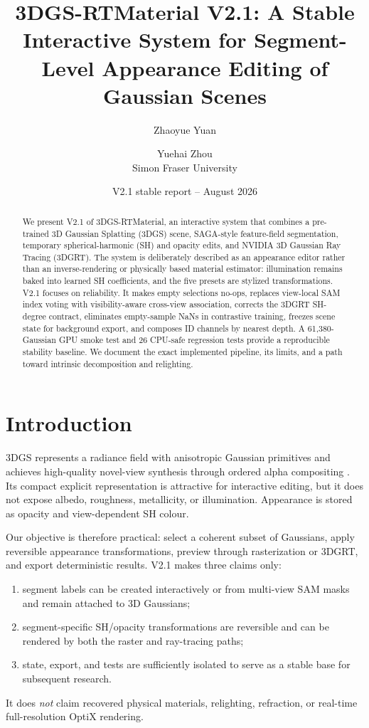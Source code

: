 \documentclass[10pt,twocolumn,a4paper]{article}
\title{3DGS-RTMaterial V2.1: A Stable Interactive System for Segment-Level Appearance Editing of Gaussian Scenes}
\author{Zhaoyue Yuan \and Yuehai Zhou\\Simon Fraser University}
\date{V2.1 stable report -- August 2026}
\begin{document}
\maketitle

\begin{abstract}
We present V2.1 of 3DGS-RTMaterial, an interactive system that combines a
pre-trained 3D Gaussian Splatting (3DGS) scene, SAGA-style feature-field
segmentation, temporary spherical-harmonic (SH) and opacity edits, and NVIDIA
3D Gaussian Ray Tracing (3DGRT). The system is deliberately described as an
appearance editor rather than an inverse-rendering or physically based
material estimator: illumination remains baked into learned SH coefficients,
and the five presets are stylized transformations. V2.1 focuses on reliability.
It makes empty selections no-ops, replaces view-local SAM index voting with
visibility-aware cross-view association, corrects the 3DGRT SH-degree
contract, eliminates empty-sample NaNs in contrastive training, freezes scene
state for background export, and composes ID channels by nearest depth. A
61,380-Gaussian GPU smoke test and 26 CPU-safe regression tests provide a
reproducible stability baseline. We document the exact implemented pipeline,
its limits, and a path toward intrinsic decomposition and relighting.
\end{abstract}

\section{Introduction}
3DGS represents a radiance field with anisotropic Gaussian primitives and
achieves high-quality novel-view synthesis through ordered alpha compositing
\citep{kerbl2023gaussians}. Its compact explicit representation is attractive
for interactive editing, but it does not expose albedo, roughness, metallicity,
or illumination. Appearance is stored as opacity and view-dependent SH colour.

Our objective is therefore practical: select a coherent subset of Gaussians,
apply reversible appearance transformations, preview through rasterization or
3DGRT, and export deterministic results. V2.1 makes three claims only:
\begin{enumerate}
  \item segment labels can be created interactively or from multi-view SAM
        masks and remain attached to 3D Gaussians;
  \item segment-specific SH/opacity transformations are reversible and can be
        rendered by both the raster and ray-tracing paths;
  \item state, export, and tests are sufficiently isolated to serve as a stable
        base for subsequent research.
\end{enumerate}
It does \emph{not} claim recovered physical materials, relighting, refraction,
or real-time full-resolution OptiX rendering.
\end{document}
